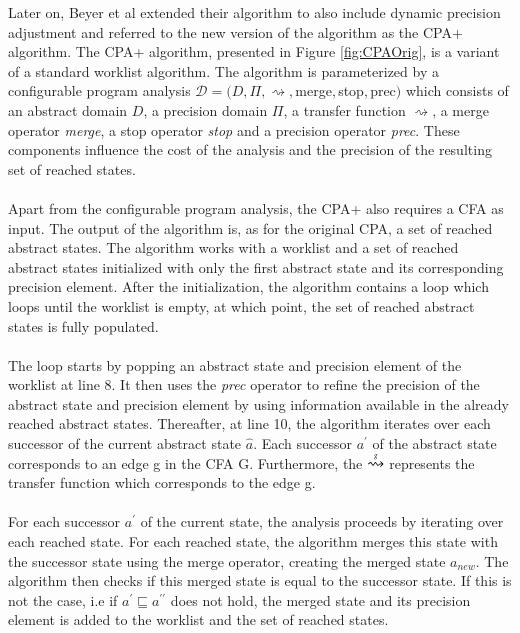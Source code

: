 \documentclass{kththesis}
\newcommand\stackrqarrow[1]{%
    \mathrel{\stackon[2pt]{$\rightsquigarrow$}{$\scriptscriptstyle#1$}}}
\renewcommand{\it}[1]{\textit{#1}}
\begin{document}
\clearpage
\noindent
Later on, Beyer et al extended their algorithm to also include dynamic precision adjustment and referred to the new version of the algorithm as the CPA+ algorithm\cite{cpaPlusAlgo}. The CPA+ algorithm, presented in Figure \ref{fig:CPAOrig}, is a variant of a standard worklist algorithm. The algorithm is parameterized by a configurable program analysis $\mathcal{D} = (D,\Pi,\rightsquigarrow,$merge$,$stop$,$prec$)$ which consists of an abstract domain $D$, a precision domain $\Pi$, a transfer function $\rightsquigarrow$, a merge operator \it{merge}, a stop operator \it{stop} and a precision operator \it{prec}. These components influence the cost of the analysis and the precision of the resulting set of reached states.
\\ \\
Apart from the configurable program analysis, the CPA+ also requires a CFA as input. The output of the algorithm is, as for the original CPA, a set of reached abstract states. The algorithm works with a worklist and a set of reached abstract states initialized with only the first abstract state and its corresponding precision element. After the initialization, the algorithm contains a loop which loops until the worklist is empty, at which point, the set of reached abstract states is fully populated. 
\\ \\
The loop starts by popping an abstract state and precision element of the worklist at line 8. It then uses the \it{prec} operator to refine the precision of the abstract state and precision element by using information available in the already reached abstract states. Thereafter, at line 10, the algorithm iterates over each successor of the current abstract state $\hat{a}$. Each successor $a^{\prime}$ of the abstract state corresponds to an edge g in the CFA G. Furthermore, the $\stackrqarrow{g}$ represents the transfer function which corresponds to the edge g.
\\ \\
For each successor $a^{\prime}$ of the current state, the analysis proceeds by iterating over each reached state. For each reached state, the algorithm merges this state with the successor state using the merge operator, creating the merged state $a_{new}$. The algorithm then checks if this merged state is equal to the successor state. If this is not the case, i.e if $a^{\prime} \sqsubseteq a^{\prime\prime}$ does not hold, the merged state and its precision element is added to the worklist and the set of reached states.
\end{document}
